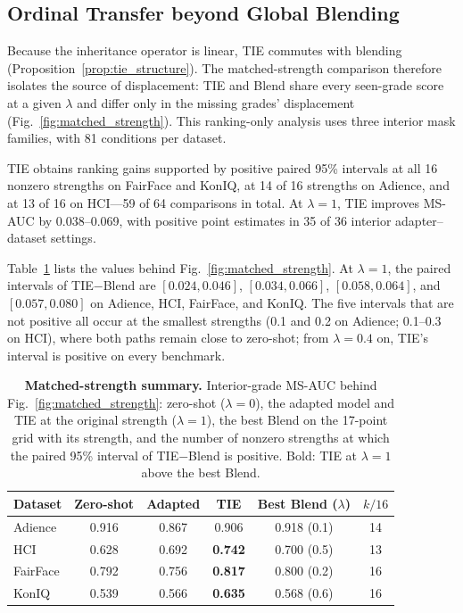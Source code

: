 \subsection{Ordinal Transfer beyond Global Blending}
\label{sec:exp_matched}

Because the inheritance operator is linear, TIE commutes with blending (Proposition~\ref{prop:tie_structure}). The matched-strength comparison therefore isolates the source of displacement: TIE and Blend share every seen-grade score at a given $\lambda$ and differ only in the missing grades' displacement (Fig.~\ref{fig:matched_strength}). This ranking-only analysis uses three interior mask families, with 81 conditions per dataset.

TIE obtains ranking gains supported by positive paired 95\% intervals at all 16 nonzero strengths on FairFace and KonIQ, at 14 of 16 strengths on Adience, and at 13 of 16 on HCI---59 of 64 comparisons in total. At $\lambda=1$, TIE improves MS-AUC by 0.038--0.069, with positive point estimates in 35 of 36 interior adapter--dataset settings.

Table~\ref{tab:matched} lists the values behind Fig.~\ref{fig:matched_strength}.
At $\lambda=1$, the paired intervals of TIE$-$Blend are $[0.024,0.046]$, $[0.034,0.066]$, $[0.058,0.064]$, and $[0.057,0.080]$ on Adience, HCI, FairFace, and KonIQ.
The five intervals that are not positive all occur at the smallest strengths (0.1 and 0.2 on Adience; 0.1--0.3 on HCI), where both paths remain close to zero-shot; from $\lambda=0.4$ on, TIE's interval is positive on every benchmark.

\setcounter{table}{4}
\begin{table}[t]
\centering
\caption{\textbf{Matched-strength summary.} Interior-grade MS-AUC behind Fig.~\ref{fig:matched_strength}: zero-shot ($\lambda{=}0$), the adapted model and TIE at the original strength ($\lambda{=}1$), the best Blend on the 17-point grid with its strength, and the number of nonzero strengths at which the paired 95\% interval of TIE$-$Blend is positive. Bold: TIE at $\lambda{=}1$ above the best Blend.}
\label{tab:matched}
\footnotesize
\setlength{\tabcolsep}{3pt}
\begin{tabular*}{\columnwidth}{@{\extracolsep{\fill}}lccccc@{}}
\toprule
Dataset & Zero-shot & Adapted & TIE & Best Blend ($\lambda$) & $k/16$ \\
\midrule
Adience  & 0.916 & 0.867 & 0.906          & 0.918 (0.1) & 14 \\
HCI      & 0.628 & 0.692 & \textbf{0.742} & 0.700 (0.5) & 13 \\
FairFace & 0.792 & 0.756 & \textbf{0.817} & 0.800 (0.2) & 16 \\
KonIQ    & 0.539 & 0.566 & \textbf{0.635} & 0.568 (0.6) & 16 \\
\bottomrule
\end{tabular*}
\end{table}
\setcounter{table}{1}

